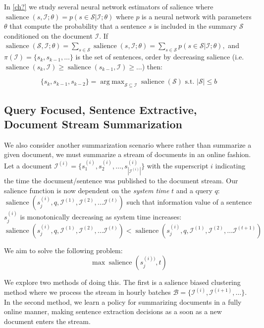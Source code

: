 In \autoref{ch?} we study several neural network estimators of salience
where $\operatorname{salience}(s, \mathcal{I}; \theta) = p(s\in\mathcal{S} | \mathcal{I}; \theta)$  
where $p$ is a neural network with parameters $\theta$ 
that compute the probability
that a sentence $s$ is included in the summary $\mathcal{S}$ conditioned 
on the document $\mathcal{I}$. 
If  $\operatorname{salience}(\mathcal{S}, \mathcal{I}; \theta) = 
  \sum_{s \in \mathcal{S}} \operatorname{salience}(s, \mathcal{I}; \theta) = 
    \sum_{s \in \mathcal{S}}  p(s\in\mathcal{S} | \mathcal{I}; \theta),$
    and $\pi(\mathcal{I}) = \{s_k, s_{k-1}, \ldots\}$ is the set 
    of sentences, order by decreasing salience (i.e. $\operatorname{salience}(s_k, \mathcal{I}) \ge \operatorname{salience}(s_{k-1}, \mathcal{I}) \ge \ldots$)
    then:

    \[ \{s_k, s_{k-1}, s_{k-2} \} = \operatorname{arg\;max}_{\mathcal{S} \subseteq \mathcal{I}} \operatorname{salience}(\mathcal{S}) \textrm{ s.t. } |\mathcal{S}| \le b 
\]




\subsection{Query Focused, Sentence Extractive, Document Stream Summarization}

We also consider another summarization scenario where rather than 
summarize a given document, we must summarize a stream of documents in 
an online fashion. Let a document $\mathcal{I}^{(i)} = \{s_1^{(i)}, s_2^{(i)},
\ldots, s_{|\mathcal{I}^{(i)}|}^{(i)} \}$ with the superscript $i$ 
indicating the time the document/sentence was published to the document
stream. Our salience function is now dependent on the \textit{system time} $t$
and a query $q$:
$\operatorname{salience}(s_j^{(i)}, q, \mathcal{I}^{(1)}, \mathcal{I}^{(2)}, \ldots \mathcal{I}^{(t)} )$ such that information value of a sentence $s_j^{(i)}$ is monotonically decreasing as system time increases: 
\[ \operatorname{salience}(s_j^{(i)}, q, \mathcal{I}^{(1)}, \mathcal{I}^{(2)}, \ldots \mathcal{I}^{(t)} ) < \operatorname{salience}(s_j^{(i)}, q, \mathcal{I}^{(1)}, \mathcal{I}^{(2)}, \ldots \mathcal{I}^{(t+1)} )\]


We aim to solve the following problem:
\[
    \max \operatorname{salience}( s_j^{(i))},t)
\]

We explore two methods of doing this. The first is 
a salience biased clustering method where we process the stream in 
hourly batches $\mathcal{B} = \{\mathcal{I}^{(i)}, \mathcal{I}^{(i+1)}, 
\ldots \}$.
In the second method, we learn a policy for summarizing documents in 
a fully online manner, making sentence extraction decisions as a soon
as a new document enters the stream.



